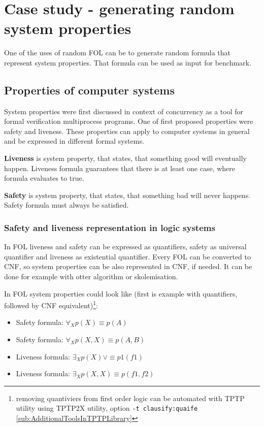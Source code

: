 \chapter{Case study - generating random system properties}

One of the uses of random \gls{FOL} can be to generate random formula that represent system properties. That formula can be used as input for benchmark.

\section{Properties of computer systems}

System properties were first discussed in context of concurrency \cite{Lampert77} as a tool for formal verification multiprocess programs. One of first proposed properties were safety and liveness. These properties can apply to computer systems in general and be expressed in different formal systems.

\textbf{Liveness} \cite{Klimek99} is system property, that states, that something good will eventually happen.
Liveness formula guarantees that there is at least one case, where formula evaluates to true.

\textbf{Safety} \cite{Klimek99} is system property, that states, that something bad will never happens.
Safety formula must always be satisfied.

\subsection{Safety and liveness representation in logic systems}

In \gls{FOL} liveness and safety can be expressed as quantifiers, safety as universal quantifier and liveness as existential quantifier. Every \gls{FOL} can be converted to \gls{CNF}, so system properties can be also represented in \gls{CNF}, if needed. It can be done for example with otter algorithm \cite{McC-Otter-URL} or skolemisation.

In \gls{FOL} system properties could look like (first is example with quantifiers, followed by CNF equivalent)\footnote{removing quantiviers from first order logic can be automated with TPTP utility using TPTP2X utility, option \texttt{-t clausify:quaife} \ref{sub:AdditionalToolsInTPTPLibrary} }:
\begin{itemize}
  \item Safety formula: $\forall_X p(X) \equiv p(A)$
  \item Safety formula: $\forall_X p(X, X) \equiv p(A, B)$
  \item Liveness formula: $\exists_X p(X) \lor \equiv p1(f1)$
  \item Liveness formula: $\exists_X p(X, X) \equiv p(f1, f2)$
\end{itemize}

